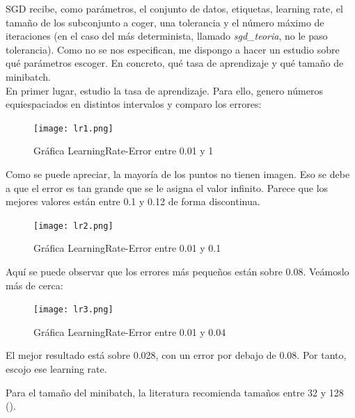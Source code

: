 SGD recibe, como parámetros, el conjunto de datos, etiquetas, learning rate, el tamaño de los subconjunto a coger, una tolerancia y el número máximo de iteraciones (en el caso del más determinista, llamado \textit{sgd\_teoria}, no le paso tolerancia). Como no se nos especifican, me dispongo a hacer un estudio sobre qué parámetros escoger. En concreto, qué tasa de aprendizaje y qué tamaño de minibatch. \\

En primer lugar, estudio la tasa de aprendizaje. Para ello, genero números equiespaciados en distintos intervalos y comparo los errores:


\begin{figure}[H] %
	\centering
	\texttt{[image: lr1.png]}  %
	\caption{Gráfica LearningRate-Error entre 0.01 y 1} 
	\label{fig:error1}
\end{figure}

Como se puede apreciar, la mayoría de los puntos no tienen imagen. Eso se debe a que el error es tan grande que se le asigna el valor infinito. Parece que los mejores valores están entre 0.1 y 0.12 de forma discontinua.

\begin{figure}[H] %
	\centering
	\texttt{[image: lr2.png]}  %
	\caption{Gráfica LearningRate-Error entre 0.01 y 0.1} 
	\label{fig:error2}
\end{figure}

Aquí se puede observar que los errores más pequeños están sobre 0.08. Veámoslo más de cerca:

\begin{figure}[H] %
	\centering
	\texttt{[image: lr3.png]}  %
	\caption{Gráfica LearningRate-Error entre 0.01 y 0.04} 
	\label{fig:error3}
\end{figure}

El mejor resultado está sobre  0.028, con un error por debajo de 0.08. Por tanto, escojo ese learning rate.

Para el tamaño del minibatch, la literatura recomienda tamaños entre 32 y 128 (\cite{lfd}).


